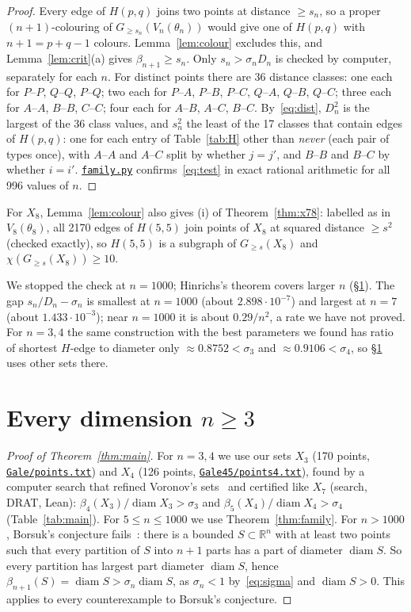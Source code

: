 \documentclass[10pt,a4paper,reqno]{amsart}
\newcommand{\R}{\mathbb R}
\DeclareMathOperator{\diam}{diam}
\newcommand{\repo}{https://github.com/Sager611/riemann/blob/a85a25ee1578748e7fa014f51dd762a6195fe923/}
\newcommand{\file}[2]{\href{\repo #2}{\texttt{#1}}}
\begin{document}
\begin{proof}
Every edge of $H(p,q)$ joins two points at distance $\ge s_n$, so a proper $(n+1)$-colouring of $G_{\ge s_n}(V_n(\theta_n))$ would give one of $H(p,q)$ with $n+1=p+q-1$ colours. Lemma~\ref{lem:colour} excludes this, and Lemma~\ref{lem:crit}(a) gives $\beta_{n+1}\ge s_n$. Only $s_n>\sigma_nD_n$ is checked by computer, separately for each $n$. For distinct points there are 36 distance classes: one each for $P$--$P$, $Q$--$Q$, $P$--$Q$; two each for $P$--$A$, $P$--$B$, $P$--$C$, $Q$--$A$, $Q$--$B$, $Q$--$C$; three each for $A$--$A$, $B$--$B$, $C$--$C$; four each for $A$--$B$, $A$--$C$, $B$--$C$. By~\eqref{eq:dist}, $D_n^2$ is the largest of the 36 class values, and $s_n^2$ the least of the 17 classes that contain edges of $H(p,q)$: one for each entry of Table~\ref{tab:H} other than \emph{never} (each pair of types once), with $A$--$A$ and $A$--$C$ split by whether $j=j'$, and $B$--$B$ and $B$--$C$ by whether $i=i'$. \file{family.py}{Riemann/Deep/Gale7/family.py} confirms~\eqref{eq:test} in exact rational arithmetic for all 996 values of $n$.
\end{proof}

For $X_8$, Lemma~\ref{lem:colour} also gives (i) of Theorem~\ref{thm:x78}: labelled as in $V_8(\theta_8)$, all 2170 edges of $H(5,5)$ join points of $X_8$ at squared distance $\ge s^2$ (checked exactly), so $H(5,5)$ is a subgraph of $G_{\ge s}(X_8)$ and $\chi(G_{\ge s}(X_8))\ge 10$.

We stopped the check at $n=1000$; Hinrichs's theorem covers larger $n$ (\S\ref{sec:all}). The gap $s_n/D_n-\sigma_n$ is smallest at $n=1000$ (about $2.898\cdot10^{-7}$) and largest at $n=7$ (about $1.433\cdot10^{-3}$); near $n=1000$ it is about $0.29/n^2$, a rate we have not proved. For $n=3,4$ the same construction with the best parameters we found has ratio of shortest $H$-edge to diameter only $\approx0.8752<\sigma_3$ and $\approx0.9106<\sigma_4$, so \S\ref{sec:all} uses other sets there.

\section{Every dimension $n\ge 3$}\label{sec:all}

\begin{proof}[Proof of Theorem~\ref{thm:main}]
For $n=3,4$ we use our sets $X_3$ (170 points, \file{Gale/points.txt}{Riemann/Deep/Gale/points.txt}) and $X_4$ (126 points, \file{Gale45/points4.txt}{Riemann/Deep/Gale45/points4.txt}), found by a computer search that refined Voronov's sets~\cite{Vo26} and certified like $X_7$ (search, DRAT, Lean): $\beta_4(X_3)/\diam X_3>\sigma_3$ and $\beta_5(X_4)/\diam X_4>\sigma_4$ (Table~\ref{tab:main}). For $5\le n\le 1000$ we use Theorem~\ref{thm:family}. For $n>1000$, Borsuk's conjecture fails~\cite[Thm.~1]{Hi02}: there is a bounded $S\subset\R^n$ with at least two points such that every partition of $S$ into $n+1$ parts has a part of diameter $\diam S$. So every partition has largest part diameter $\diam S$, hence $\beta_{n+1}(S)=\diam S>\sigma_n\diam S$, as $\sigma_n<1$ by~\eqref{eq:sigma} and $\diam S>0$. This applies to every counterexample to Borsuk's conjecture.
\end{proof}
\end{document}
